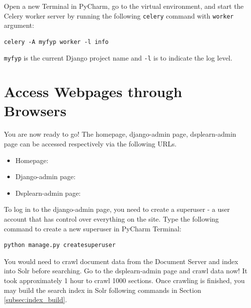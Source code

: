 Open a new Terminal in PyCharm, go to the virtual environment, and start the Celery worker server by running the following \texttt{celery} command with \texttt{worker} argument:
\begin{verbatim}
celery -A myfyp worker -l info
\end{verbatim}

\texttt{myfyp} is the current Django project name and \texttt{-l} is to indicate the log level.

\section{Access Webpages through Browsers}
You are now ready to go! The homepage, django-admin page, dsplearn-admin page can be accessed respectively via the following URLs.
\begin{itemize}
\item Homepage: 
\item Django-admin page: 
\item Dsplearn-admin page: 
\end{itemize}

To log in to the django-admin page, you need to create a superuser - a user account that has control over everything on the site. Type the following command to create a new superuser in PyCharm Terminal:
\begin{verbatim}
python manage.py createsuperuser
\end{verbatim}

You would need to crawl document data from the Document Server and index into Solr before searching. Go to the dsplearn-admin page and crawl data now! It took approximately 1 hour to crawl 1000 sections. Once crawling is finished, you may build the search index in Solr following commands in Section \ref{subsec:index_build}.
